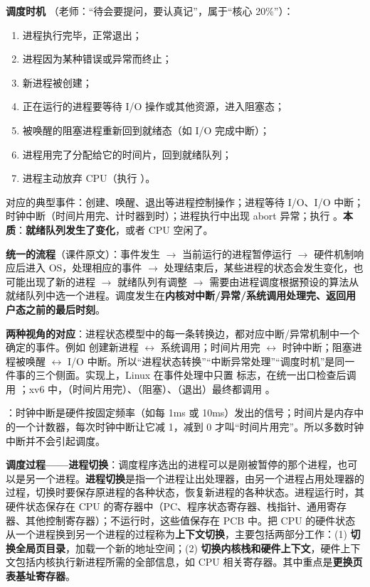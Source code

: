 \textbf{调度时机} \bk（老师：“待会要提问，要认真记”，属于“核心 20\%”）：
\begin{enumerate}
    \item 进程执行完毕，正常退出；
    \item 进程因为某种错误或异常而终止；
    \item 新进程被创建；
    \item 正在运行的进程要等待 I/O 操作或其他资源，进入阻塞态；
    \item 被唤醒的阻塞进程重新回到就绪态（如 I/O 完成中断）；
    \item 进程用完了分配给它的时间片，回到就绪队列；
    \item 进程主动放弃 CPU（执行 ）。
\end{enumerate}
对应的典型事件：创建、唤醒、退出等进程控制操作；进程等待 I/O、I/O 中断；时钟中断（时间片用完、计时器到时）；进程执行中出现 abort 异常；执行 。\textbf{本质}：\textbf{就绪队列发生了变化}，或者 CPU 空闲了。

\textbf{统一的流程}（课件原文）：事件发生 $\to$ 当前运行的进程暂停运行 $\to$ 硬件机制响应后进入 OS，处理相应的事件 $\to$ 处理结束后，某些进程的状态会发生变化，也可能出现了新的进程 $\to$ 就绪队列有调整 $\to$ 需要由进程调度根据预设的算法从就绪队列中选一个进程。调度发生在\textbf{内核对中断/异常/系统调用处理完、返回用户态之前的最后时刻}。

\textbf{两种视角的对应}：进程状态模型中的每一条转换边，都对应中断/异常机制中一个确定的事件。例如  创建新进程 $\leftrightarrow$ 系统调用；时间片用完 $\leftrightarrow$ 时钟中断；阻塞进程被唤醒 $\leftrightarrow$ I/O 中断。所以“进程状态转换”“中断异常处理”“调度时机”是同一件事的三个侧面。实现上，Linux 在事件处理中只置  标志，在统一出口检查后调用 ；xv6 中，（时间片用完）、（阻塞）、（退出）最终都调用 。

\ez {}：时钟中断是硬件按固定频率（如每 1ms 或 10ms）发出的信号；时间片是内存中的一个计数器，每次时钟中断让它减 1，减到 0 才叫“时间片用完”。所以多数时钟中断并不会引起调度。

\textbf{调度过程——进程切换}：调度程序选出的进程可以是刚被暂停的那个进程，也可以是另一个进程。\textbf{进程切换}是指一个进程让出处理器，由另一个进程占用处理器的过程，切换时要保存原进程的各种状态，恢复新进程的各种状态。进程运行时，其硬件状态保存在 CPU 的寄存器中（PC、程序状态寄存器、栈指针、通用寄存器、其他控制寄存器）；不运行时，这些值保存在 PCB 中。把 CPU 的硬件状态从一个进程换到另一个进程的过程称为\textbf{上下文切换}，主要包括两部分工作：(1) \textbf{切换全局页目录}，加载一个新的地址空间；(2) \textbf{切换内核栈和硬件上下文}，硬件上下文包括内核执行新进程所需的全部信息，如 CPU 相关寄存器。其中重点是\textbf{更换页表基址寄存器}。

